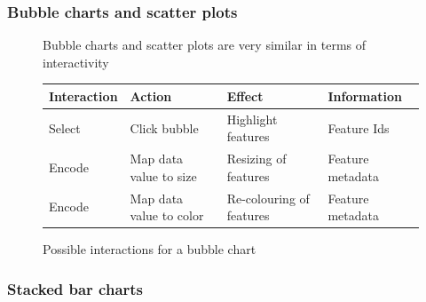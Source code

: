 \documentclass{article}
\begin{document}
\subsubsection{Bubble charts and scatter plots}

\begin{figure}
  \centering
    \qquad
    \caption{Bubble charts and scatter plots are very similar in terms of interactivity}%
    \label{fig:concept:chart-types:bubble-chart}
\end{figure}

\begin{figure}
  \begin{center}
    \begin{tabular}{l l l l}
      Interaction & Action & Effect & Information \\
      \hline
      Select & Click bubble & Highlight features & Feature Ids \\
      Encode & Map data value to size  & Resizing of features     & Feature metadata  \\
      Encode & Map data value to color & Re-colouring of features & Feature metadata  \\
    \end{tabular}
  \end{center}
  \caption{Possible interactions for a bubble chart}
  \label{tab:concept:chart-types:bar-chart}
\end{figure}

\subsubsection{Stacked bar charts}
\end{document}
